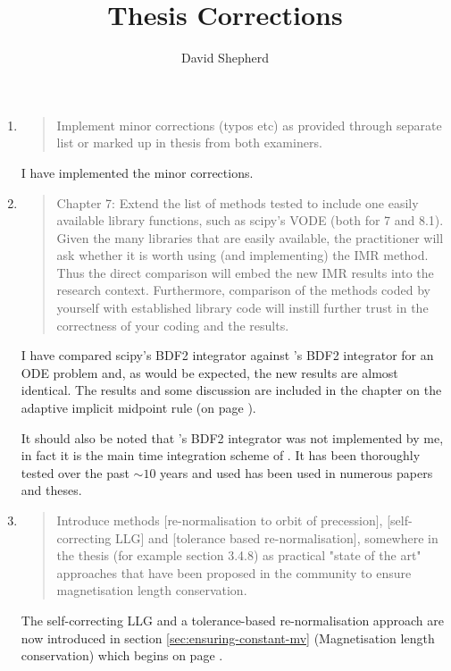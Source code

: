 \documentclass[12pt,a4paper,pdftex]{article}
\title{Thesis Corrections}
\author{David Shepherd}
\begin{document}
\maketitle


\begin{enumerate}
\item
  \begin{quotation}
    Implement minor corrections (typos etc) as provided through
    separate list or marked up in thesis from both examiners.
  \end{quotation}
  I have implemented the minor corrections.

\item
  \begin{quotation}
    Chapter 7: Extend the list of methods tested to include one easily
    available library functions, such as scipy's VODE (both for 7 and
    8.1). Given the many libraries that are easily available, the
    practitioner will ask whether it is worth using (and implementing) the
    IMR method. Thus the direct comparison will embed the new IMR results
    into the research context. Furthermore, comparison of the methods
    coded by yourself with established library code will instill further
    trust in the correctness of your coding and the results.
  \end{quotation}
  I have compared scipy's \vode BDF2 integrator against \oomph's BDF2 integrator for an ODE problem and, as would be expected, the new results are almost identical. The results and some discussion are included in the chapter on the adaptive implicit midpoint rule (on page \pageref{fig:vode-osc-example}).

  It should also be noted that \oomph's BDF2 integrator was not implemented by me, in fact it is the main time integration scheme of \oomph.
  It has been thoroughly tested over the past $\sim 10$ years and used has been used in numerous papers and theses.

\item
  \begin{quotation}
    Introduce methods [re-normalisation to orbit of precession],
    [self-correcting LLG] and [tolerance based re-normalisation], somewhere
    in the thesis (for example section 3.4.8) as practical "state of the
    art" approaches that have been proposed in the community to ensure
    magnetisation length conservation.
  \end{quotation}
  The self-correcting LLG and a tolerance-based re-normalisation approach are now introduced in section \ref{sec:ensuring-constant-mv} (Magnetisation length conservation) which begins on page \pageref{alt-ml-renorm-intro}.


\end{enumerate}
\end{document}
